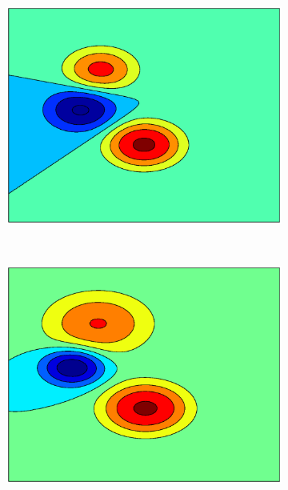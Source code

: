 \documentclass[useAMS,usenatbib,fleqn]{mn2e}
\begin{document}
\begin{figure}
         \begin{subfigure}[b]{0.3\columnwidth}
                \includegraphics[width=\textwidth]{figures/GPGL3.eps}
        \end{subfigure}
        ~
         \begin{subfigure}[b]{0.3\columnwidth}
                \includegraphics[width=\textwidth]{figures/GPVL3.eps}
        \end{subfigure}
        ~
        \begin{subfigure}[b]{0.3\columnwidth}

\end{subfigure}
\end{figure}
\end{document}
